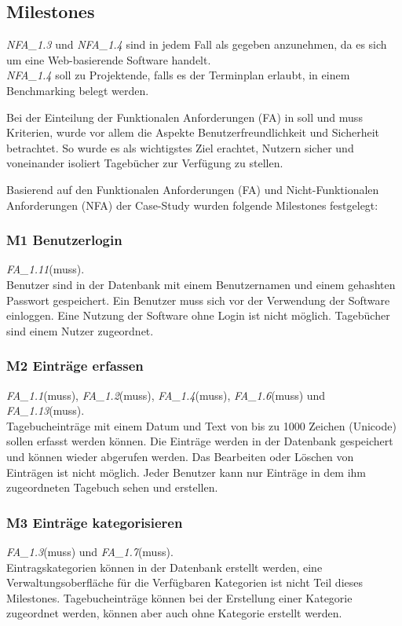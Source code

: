 \subsection{Milestones}
\emph{NFA\_1.3} und \emph{NFA\_1.4} sind in jedem Fall als gegeben anzunehmen, da es sich um eine Web-basierende Software handelt.\\
\emph{NFA\_1.4} soll zu Projektende, falls es der Terminplan erlaubt, in einem Benchmarking belegt werden.

\vspace{3mm}
\noindent
Bei der Einteilung der Funktionalen Anforderungen (FA) in soll und muss Kriterien, wurde vor allem die Aspekte Benutzerfreundlichkeit und Sicherheit betrachtet. So wurde es als wichtigstes Ziel erachtet, Nutzern sicher und voneinander isoliert Tagebücher zur Verfügung zu stellen.

Basierend auf den Funktionalen Anforderungen (FA) und Nicht-Funktionalen Anforderungen (NFA) der Case-Study wurden folgende Milestones festgelegt:

\subsubsection{M1 Benutzerlogin}
\emph{FA\_1.11}(muss).\\
Benutzer sind in der Datenbank mit einem Benutzernamen und einem gehashten Passwort gespeichert. Ein Benutzer muss sich vor der Verwendung der Software einloggen. Eine Nutzung der Software ohne Login ist nicht möglich. Tagebücher sind einem Nutzer zugeordnet.

\subsubsection{M2 Einträge erfassen}
\emph{FA\_1.1}(muss), \emph{FA\_1.2}(muss), \emph{FA\_1.4}(muss), \emph{FA\_1.6}(muss) und \emph{FA\_1.13}(muss).\\
Tagebucheinträge mit einem Datum und Text von bis zu 1000 Zeichen (Unicode) sollen erfasst werden können. Die Einträge werden in der Datenbank gespeichert und können wieder abgerufen werden. Das Bearbeiten oder Löschen von Einträgen ist nicht möglich. Jeder Benutzer kann nur Einträge in dem ihm zugeordneten Tagebuch sehen und erstellen.

\subsubsection{M3 Einträge kategorisieren}
\emph{FA\_1.3}(muss) und \emph{FA\_1.7}(muss).\\
Eintragskategorien können in der Datenbank erstellt werden, eine Verwaltungsoberfläche für die Verfügbaren Kategorien ist nicht Teil dieses Milestones. Tagebucheinträge können bei der Erstellung einer Kategorie zugeordnet werden, können aber auch ohne Kategorie erstellt werden.


